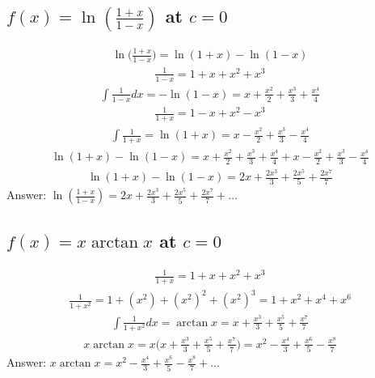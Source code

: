 \documentclass{article}
\begin{document}
\subsection{$f(x) = \ln{\left( \frac{1 + x}{1 - x} \right)} $ at $c = 0$}
\begin{align*}
	\ln{\bigg(\frac{1 + x}{1 - x}\bigg)} = \ln{(1 + x)} - \ln{(1 - x)}
\end{align*}
\begin{align*}
	\frac{1}{1 - x} = 1 + x + x^2 + x^3
\end{align*}
\begin{align*}
	\int{\frac{1}{1 - x}dx} = -\ln{(1 - x)} = x + \frac{x^2}{2} + \frac{x^3}{3} + \frac{x^4}{4}
\end{align*}
\begin{align*}
	\frac{1}{1 + x} = 1 - x + x^2 - x^3
\end{align*}
\begin{align*}
	\int{\frac{1}{1 + x}} = \ln{(1 + x)} = x - \frac{x^2}{2} + \frac{x^3}{3} - \frac{x^4}{4}
\end{align*}
\begin{align*}
	\ln{(1 + x)} - \ln{(1 - x)} = x + \frac{x^2}{2} + \frac{x^3}{3} + \frac{x^4}{4} + x - \frac{x^2}{2} + \frac{x^3}{3} - \frac{x^4}{4}
\end{align*}
\begin{align*}
	\ln{(1 + x)} - \ln{(1 - x)} = 2x + \frac{2x^3}{3} + \frac{2x^5}{5} + \frac{2x^7}{7}
\end{align*}
Answer: $\ln{\left( \frac{1 + x}{1 - x} \right)} = 2x + \frac{2x^3}{3} + \frac{2x^5}{5} + \frac{2x^7}{7} + \dots$

\subsection{$f(x) = x \arctan{x}$ at $c = 0$}
\begin{align*}
	\frac{1}{1 + x} = 1 + x + x^2 + x^3
\end{align*}
\begin{align*}
	\frac{1}{1 + x^2} = 1 + (x^2) + (x^2)^2 + (x^2)^3 = 1 + x^2 + x^4 + x^6
\end{align*}
\begin{align*}
	\int{\frac{1}{1 + x^2}dx} = \arctan{x} = x + \frac{x^3}{3} + \frac{x^5}{5} + \frac{x^7}{7}
\end{align*}
\begin{align*}
	x \arctan{x} = x \bigg( x + \frac{x^3}{3} + \frac{x^5}{5} + \frac{x^7}{7} \bigg) = x^2 - \frac{x^4}{3} + \frac{x^6}{5} - \frac{x^8}{7}
\end{align*}
Answer: $x \arctan{x} = x^2 - \frac{x^4}{3} + \frac{x^6}{5} - \frac{x^8}{7} + \dots$
\end{document}
